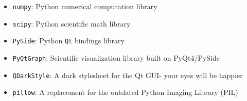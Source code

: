 \begin{itemize}
\item \verb|numpy|: Python numerical computation library
\item \verb|scipy|: Python scientific math library
\item \verb|PySide|: Python \verb|Qt| bindings library
\item \verb|PyQtGraph|: Scientific visualization library built on PyQt4/PySide
\item \verb|QDarkStyle|: A dark stylesheet for the Qt GUI- your eyes will be happier
\item \verb|pillow|: A replacement for the outdated Python Imaging Library (PIL)
\end{itemize}



